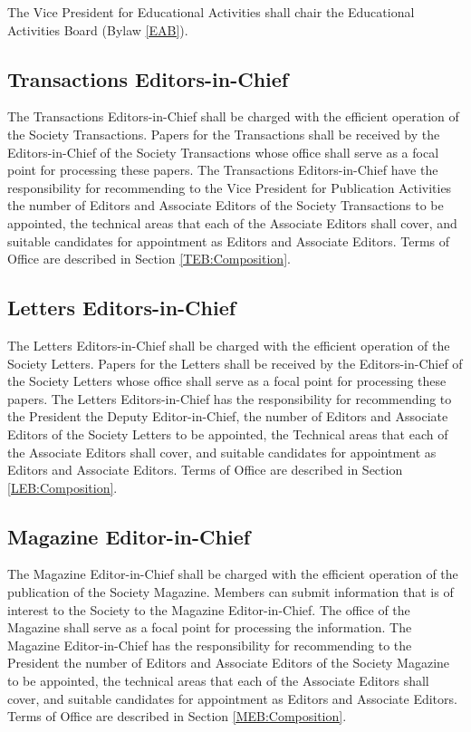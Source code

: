 \documentclass[10pt]{article}
\newcommand{\blref}[1]{Bylaw \ref{#1}}
\newcommand{\secref}[1]{Section \ref{#1}}
\begin{document}
The Vice President for Educational Activities shall chair the Educational Activities Board (\blref{EAB}).


\subsection{Transactions Editors-in-Chief}

The Transactions Editors-in-Chief shall be charged with the efficient operation of the Society Transactions.  Papers for the Transactions shall be received by the Editors-in-Chief of the Society Transactions whose office shall serve as a focal point for processing these papers. The Transactions Editors-in-Chief have the responsibility for recommending to the Vice President for Publication Activities the number of Editors and Associate Editors of the Society Transactions to be appointed, the technical areas that each of the Associate Editors shall cover, and suitable candidates for appointment as Editors and Associate Editors. Terms of Office are described in \secref{TEB:Composition}.


\subsection{Letters Editors-in-Chief}

The Letters Editors-in-Chief shall be charged with the efficient operation of the Society Letters.  Papers for the Letters shall be received by the Editors-in-Chief of the Society Letters whose office shall serve as a focal point for processing these papers.  The Letters Editors-in-Chief has the responsibility for recommending to the President the Deputy Editor-in-Chief, the number of Editors and Associate Editors of the Society Letters to be appointed, the Technical areas that each of the Associate Editors shall cover, and suitable candidates for appointment as Editors and Associate Editors. Terms of Office are described in \secref{LEB:Composition}.


\subsection{Magazine Editor-in-Chief}

The Magazine Editor-in-Chief shall be charged with the efficient operation of the publication of the Society Magazine. Members can submit information that is of interest to the Society to the Magazine Editor-in-Chief. The office of the Magazine shall serve as a focal point for processing the information. The Magazine Editor-in-Chief has the responsibility for recommending to the President the number of Editors and Associate Editors of the Society Magazine to be appointed, the technical areas that each of the Associate Editors shall cover, and suitable candidates for appointment as Editors and Associate Editors. Terms of Office are described in \secref{MEB:Composition}. 
\end{document}

